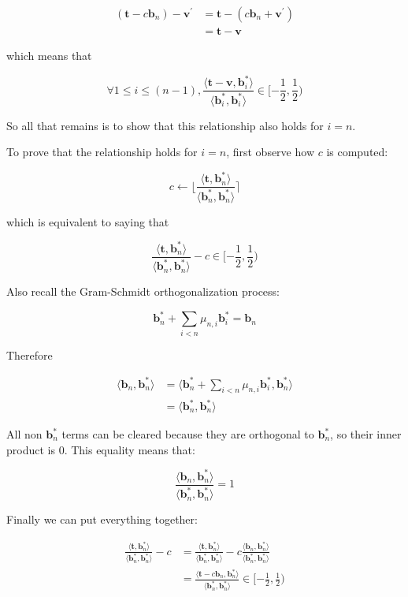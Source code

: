 $$
\begin{aligned}
(\mathbf{t} - c\mathbf{b}_n) - \mathbf{v}^\prime 
&= \mathbf{t} - (c\mathbf{b}_n + \mathbf{v}^\prime) \\
&= \mathbf{t} - \mathbf{v}
\end{aligned}
$$

which means that

$$
\forall 1 \leq i \leq (n-1), 
\frac{
    \langle
        \mathbf{t} - \mathbf{v}, 
        \mathbf{b}_i^\ast
    \rangle
}{
    \langle
        \mathbf{b}_i^\ast, \mathbf{b}_i^\ast
    \rangle
} \in [-\frac{1}{2}, \frac{1}{2})
$$

So all that remains is to show that this relationship also holds for $i = n$.

To prove that the relationship holds for $i = n$, first observe how $c$ is computed:

$$
c \leftarrow \lfloor \frac{\langle\mathbf{t}, \mathbf{b}_n^\ast\rangle}{\langle\mathbf{b}_n^\ast, \mathbf{b}_n^\ast\rangle} \rceil
$$

which is equivalent to saying that

$$
\frac{
    \langle\mathbf{t}, \mathbf{b}_n^\ast\rangle
}{
    \langle\mathbf{b}_n^\ast, \mathbf{b}_n^\ast\rangle
}
- c \in [-\frac{1}{2}, \frac{1}{2})
$$

Also recall the Gram-Schmidt orthogonalization process:

$$
\mathbf{b}_n^\ast +\sum_{i<n}\mu_{n, i}\mathbf{b}_i^\ast = \mathbf{b}_n
$$

Therefore

$$
\begin{aligned}
\langle\mathbf{b}_n, \mathbf{b}_n^\ast\rangle
&= \langle 
    \mathbf{b}_n^\ast +\sum_{i<n}\mu_{n, i}\mathbf{b}_i^\ast, \mathbf{b}_n^\ast
\rangle \\
&= \langle\mathbf{b}_n^\ast, \mathbf{b}_n^\ast\rangle
\end{aligned}
$$

All non $\mathbf{b}_n^\ast$ terms can be cleared because they are orthogonal to $\mathbf{b}_n^\ast$, so their inner product is 0. This equality means that:

$$
\frac{
    \langle\mathbf{b}_n, \mathbf{b}_n^\ast\rangle
}{
    \langle\mathbf{b}_n^\ast, \mathbf{b}_n^\ast\rangle
} = 1
$$

Finally we can put everything together:

$$
\begin{aligned}
\frac{
    \langle\mathbf{t}, \mathbf{b}_n^\ast\rangle
}{
    \langle\mathbf{b}_n^\ast, \mathbf{b}_n^\ast\rangle
}
- c 
&= \frac{
    \langle\mathbf{t}, \mathbf{b}_n^\ast\rangle
}{
    \langle\mathbf{b}_n^\ast, \mathbf{b}_n^\ast\rangle
}
- c \frac{
    \langle\mathbf{b}_n, \mathbf{b}_n^\ast\rangle
}{
    \langle\mathbf{b}_n^\ast, \mathbf{b}_n^\ast\rangle
} \\
&= \frac{
    \langle\mathbf{t} - c\mathbf{b}_n, \mathbf{b}_n^\ast\rangle
}{
    \langle\mathbf{b}_n^\ast, \mathbf{b}_n^\ast\rangle
}
\in [-\frac{1}{2}, \frac{1}{2})
\end{aligned}
$$

